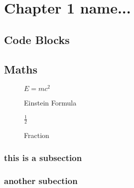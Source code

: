 \chapter{Chapter 1 name...}


\section{Code Blocks}



\section{Maths}

\begin{figure}[ht]
    \centering
    \begin{math}
        E=mc^2 
    \end{math}
    \caption{Einstein Formula}
    \label{fig:Emc2}

\end{figure}

\begin{figure}[ht]
    \centering
    \begin{math}
        \frac{1}{2} 
    \end{math}
    \caption{Fraction}
    \label{fig:Fraction 1}

\end{figure}

\subsection{this is a subsection}

\lipsum[7-8]

\subsection{another subection}

\lipsum[4-6]
